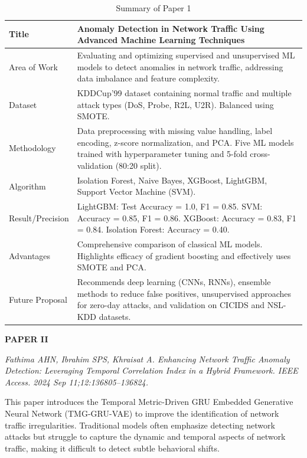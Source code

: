 \documentclass[12pt,a4paper]{report}
\begin{document}
\begin{table}[H]
\centering
\renewcommand{\arraystretch}{1.3}
\begin{tabularx}{\textwidth}{|>{\centering\arraybackslash}p{3.2cm}|X|}
\hline
Title & Anomaly Detection in Network Traffic Using Advanced Machine Learning Techniques \\
\hline
Area of Work & Evaluating and optimizing supervised and unsupervised ML models to detect anomalies in network traffic, addressing data imbalance and feature complexity. \\
\hline
Dataset & KDDCup'99 dataset containing normal traffic and multiple attack types (DoS, Probe, R2L, U2R). Balanced using SMOTE. \\
\hline
Methodology & Data preprocessing with missing value handling, label encoding, z-score normalization, and PCA. Five ML models trained with hyperparameter tuning and 5-fold cross-validation (80:20 split). \\
\hline
Algorithm & Isolation Forest, Naive Bayes, XGBoost, LightGBM, Support Vector Machine (SVM). \\
\hline
Result/Precision & LightGBM: Test Accuracy = 1.0, F1 = 0.85. SVM: Accuracy = 0.85, F1 = 0.86. XGBoost: Accuracy = 0.83, F1 = 0.84. Isolation Forest: Accuracy = 0.40. \\
\hline
Advantages & Comprehensive comparison of classical ML models. Highlights efficacy of gradient boosting and effectively uses SMOTE and PCA. \\
\hline
Future Proposal & Recommends deep learning (CNNs, RNNs), ensemble methods to reduce false positives, unsupervised approaches for zero-day attacks, and validation on CICIDS and NSL-KDD datasets. \\
\hline
\end{tabularx}
\caption{Summary of Paper 1}
\label{tab:paper1}
\end{table}

\newpage
\textbf{PAPER II}

\textit{Fathima AHN, Ibrahim SPS, Khraisat A. Enhancing Network Traffic Anomaly Detection: Leveraging Temporal Correlation Index in a Hybrid Framework. IEEE Access. 2024 Sep 11;12:136805--136824.}

This paper introduces the Temporal Metric-Driven GRU Embedded Generative Neural Network (TMG-GRU-VAE) to improve the identification of network traffic irregularities. Traditional models often emphasize detecting network attacks but struggle to capture the dynamic and temporal aspects of network traffic, making it difficult to detect subtle behavioral shifts.
\end{document}
